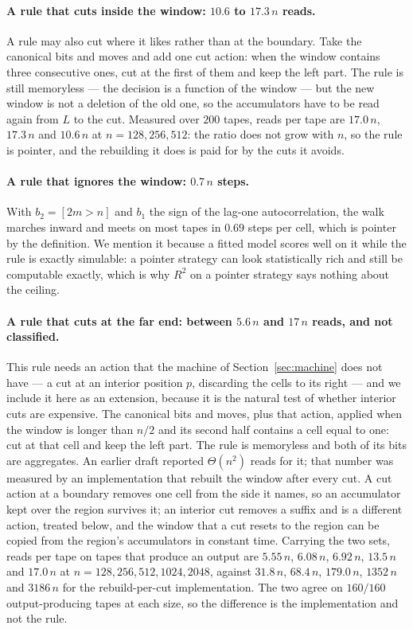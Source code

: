 \documentclass[11pt]{article}
\begin{document}
\paragraph{A rule that cuts inside the window: $10.6$ to $17.3\,n$ reads.} A rule may also cut where it likes
rather than at the boundary. Take the canonical bits and moves and add one cut action: when the window
contains three consecutive ones, cut at the first of them and keep the left part. The rule is still
memoryless --- the decision is a function of the window --- but the new window is not a deletion of the
old one, so the accumulators have to be read again from $L$ to the cut. Measured over $200$ tapes, reads
per tape are $17.0\,n$, $17.3\,n$ and $10.6\,n$ at $n=128,256,512$: the ratio does not grow with $n$, so
the rule is pointer, and the rebuilding it does is paid for by the cuts it avoids.

\paragraph{A rule that ignores the window: $0.7\,n$ steps.} With $b_2=[2m>n]$ and $b_1$ the sign of the
lag-one autocorrelation, the walk marches inward and meets on most tapes in $0.69$ steps per cell, which
is pointer by the definition. We mention it because a fitted model scores well on it while the rule is exactly simulable:
a pointer strategy can look statistically rich and still be computable exactly, which is why $R^2$ on a
pointer strategy says nothing about the ceiling.

\paragraph{A rule that cuts at the far end: between $5.6\,n$ and $17\,n$ reads, and not classified.} This rule needs an action that the machine
of Section~\ref{sec:machine} does not have --- a cut at an interior position $p$, discarding the
cells to its right --- and we include it here as an extension, because it is the natural test of
whether interior cuts are expensive. The canonical bits and moves, plus that action, applied when the
window is longer than $n/2$ and its second half contains a cell equal to one: cut at that cell and
keep the left part. The rule is memoryless and both of its bits are aggregates. An
earlier draft reported $\Theta(n^2)$ reads for it; that number was measured by an implementation that
rebuilt the window after every cut. A cut action at a boundary removes one cell from the side it
names, so an accumulator kept over the region survives it; an interior cut removes a suffix and is a
different action, treated below, and the window that a cut resets to the region can be copied from the
region's accumulators in constant time. Carrying the two sets, reads per tape on tapes that produce an
output are $5.55\,n$, $6.08\,n$, $6.92\,n$, $13.5\,n$ and $17.0\,n$ at $n=128,256,512,1024,2048$,
against $31.8\,n$, $68.4\,n$, $179.0\,n$, $1352\,n$ and $3186\,n$ for the rebuild-per-cut
implementation. The two agree on $160/160$ output-producing tapes at each size, so the difference is the
implementation and not the rule.
\end{document}
